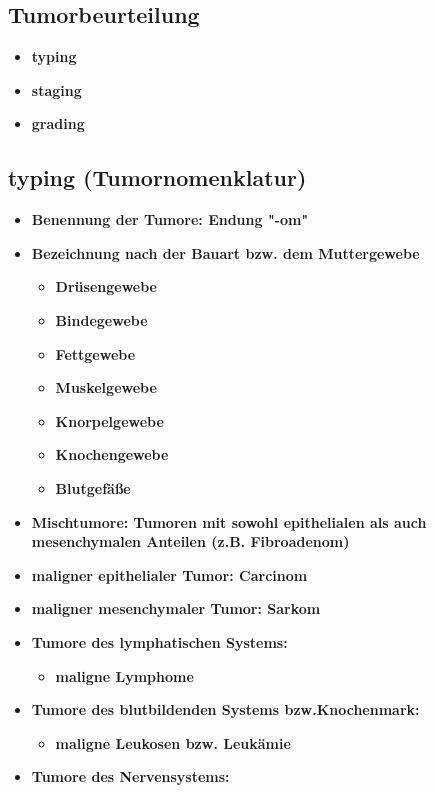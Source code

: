 	\subsection{Tumorbeurteilung}
		\begin{itemize}
			\item \textbf{typing}
			\item \textbf{staging}
			\item \textbf{grading}
		\end{itemize}
	\subsection{typing (Tumornomenklatur)}
		\begin{itemize}
			\item \textbf{Benennung der Tumore: Endung  "-om"}
			\item \textbf{Bezeichnung nach der Bauart bzw. dem Muttergewebe}
				\begin{itemize}
					\item \textbf{Drüsengewebe}
					\item \textbf{Bindegewebe}
					\item \textbf{Fettgewebe}
					\item \textbf{Muskelgewebe}
					\item \textbf{Knorpelgewebe}
					\item \textbf{Knochengewebe}
					\item \textbf{Blutgefäße}
				\end{itemize}
			\item \textbf{Mischtumore: Tumoren mit sowohl epithelialen als auch mesenchymalen Anteilen (z.B. Fibroadenom)}
			\item \textbf{maligner epithelialer Tumor: Carcinom}
			\item \textbf{maligner mesenchymaler Tumor: Sarkom}
			\item \textbf{Tumore des lymphatischen Systems:}
				\begin{itemize}
					\item \textbf{maligne Lymphome}
				\end{itemize}
			\item \textbf{Tumore des blutbildenden Systems bzw.Knochenmark:}
				\begin{itemize}
					\item \textbf{maligne Leukosen bzw. Leukämie}
				\end{itemize}
			\item \textbf{Tumore des Nervensystems:}

\end{itemize}

